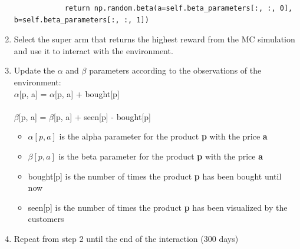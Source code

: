 \begin{enumerate}
\begin{verbatim}
            return np.random.beta(a=self.beta_parameters[:, :, 0], b=self.beta_parameters[:, :, 1])
        \end{verbatim}
    \item Select the super arm that returns the highest reward from the MC simulation and use it to interact with the environment.
    \item Update the $\alpha$ and $\beta$ parameters according to the observations of the environment:\\
        $\alpha$[p, a] = $\alpha$[p, a] + bought[p]\\\\
        $\beta$[p, a] = $\beta$[p, a] + seen[p] - bought[p]
    \begin{itemize}
        \item $\alpha[p, a]$ is the alpha parameter for the product {\bf p} with the price {\bf a}
        \item $\beta[p, a]$ is the beta parameter for the product {\bf p} with the price {\bf a}
        \item bought[p] is the number of times the product {\bf p} has been bought until now
        \item seen[p] is the number of times the product {\bf p} has been visualized by the customers
    \end{itemize}
    \item Repeat from step 2 until the end of the interaction (300 days)
\end{enumerate}
